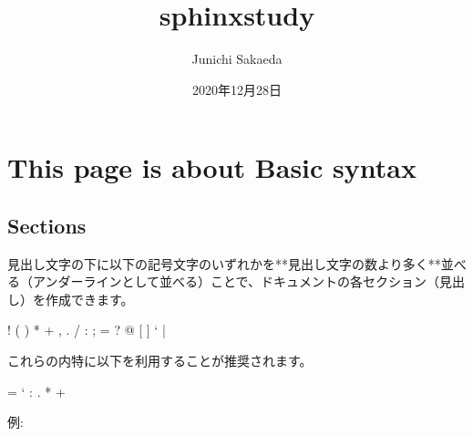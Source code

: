 \documentclass[letterpaper,10pt,dvipdfmx,openany,oneside]{sphinxmanual}
\title{sphinx\sphinxhyphen{}study}
\date{2020年12月28日}
\author{Junichi Sakaeda}
\begin{document}
\pagestyle{empty}
\sphinxmaketitle
\pagestyle{plain}
\sphinxtableofcontents
\pagestyle{normal}
\label{\detokenize{index::doc}}



\chapter{This page is about Basic syntax}
\label{\detokenize{1.chapter/basic_syntax:this-page-is-about-basic-syntax}}\label{\detokenize{1.chapter/basic_syntax::doc}}

\section{Sections}
\label{\detokenize{1.chapter/basic_syntax:sections}}
見出し文字の下に以下の記号文字のいずれかを**見出し文字の数より多く**並べる（アンダーラインとして並べる）ことで、ドキュメントの各セクション（見出し）を作成できます。

\begin{sphinxVerbatim}[commandchars=\\\{\}]
! \PYGZdq{} \PYGZsh{} \PYGZdl{} \PYGZpc{} \PYGZam{} \PYGZsq{} ( ) * + , \PYGZhy{} . / : ; \PYGZlt{} = \PYGZgt{} ? @ [ \PYGZbs{} ] \PYGZca{} \PYGZus{} ` \PYGZob{} | \PYGZcb{} \PYGZti{}
\end{sphinxVerbatim}

これらの内特に以下を利用することが推奨されます。

\begin{sphinxVerbatim}[commandchars=\\\{\}]
= \PYGZhy{} ` : . \PYGZsq{} \PYGZdq{} \PYGZti{} \PYGZca{} \PYGZus{} * + \PYGZsh{}
\end{sphinxVerbatim}

例:

\begin{sphinxVerbatim}[commandchars=\\\{\}]





\end{sphinxVerbatim}
\end{document}
